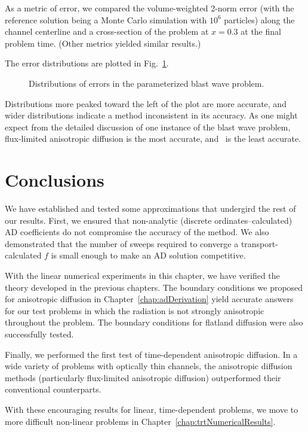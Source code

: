 As a metric of error, we compared the volume-weighted
2-norm error (with the reference solution being a Monte Carlo simulation
with $10^6$ particles) along the channel centerline and a cross-section of the
problem at $x=0.3$ at the final problem time. (Other metrics yielded similar
results.)

The error distributions are plotted in Fig.~\ref{fig:tdBlastwaveParameterized}.
%
\begin{figure}[htb]
  \centering\small

  \caption{Distributions of errors in the parameterized blast wave problem.}
  \label{fig:tdBlastwaveParameterized}
\end{figure}
%
Distributions more peaked toward the left of the plot are more accurate, and
wider distributions indicate a method inconsistent in its accuracy. As one might
expect from the detailed discussion of one instance of the blast wave problem,
flux-limited anisotropic diffusion is the most accurate, and \Pone\ is the least
accurate.

\section{Conclusions}

We have established and tested some approximations that undergird the rest of
our results.  First, we ensured that non-analytic (discrete
ordinates--calculated) AD coefficients do not compromise the accuracy of the
method. We also demonstrated that the number of sweeps required to converge a
transport-calculated $f$ is small enough to make an AD solution competitive.

With the linear numerical experiments in this chapter, we have verified the
theory developed in the previous chapters. The boundary conditions we proposed
for anisotropic diffusion in Chapter~\ref{chap:adDerivation} yield accurate
answers for our test problems in which the radiation is not strongly anisotropic
throughout the problem. The boundary conditions for flatland diffusion were also
successfully tested.

Finally, we performed the first test of time-dependent anisotropic diffusion. In
a wide variety of problems with optically thin channels, the anisotropic
diffusion methods (particularly flux-limited anisotropic diffusion) outperformed
their conventional counterparts.

With these encouraging results for linear, time-dependent problems, we move to
more difficult non-linear problems in Chapter~\ref{chap:trtNumericalResults}.

